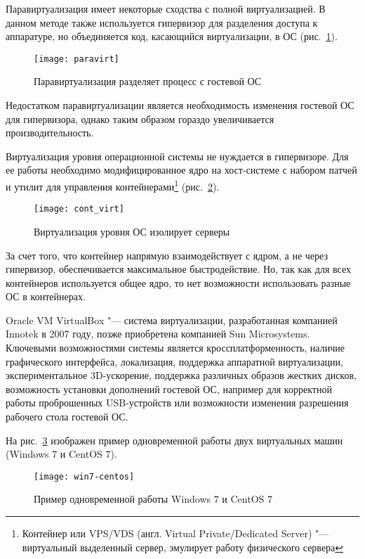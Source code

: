 Паравиртуализация имеет некоторые сходства с полной виртуализацией. 
В данном методе также используется гипервизор для разделения доступа к аппаратуре, но объединяется код, касающийся виртуализации, в ОС \cite{virtuallinux} (рис.~\ref{pic:paravirt}).
\begin{figure}[ht]
    \centering
	\texttt{[image: paravirt]}
	\caption{Паравиртуализация разделяет процесс с гостевой ОС}\label{pic:paravirt}
\end{figure}

Недостатком паравиртуализации является необходимость изменения гостевой ОС для гипервизора, однако таким образом гораздо увеличивается производительность.
 
Виртуализация уровня операционной системы не нуждается в гипервизоре. 
Для ее работы необходимо модифицированное ядро на хост-системе с набором патчей и утилит для управления контейнерами\footnote{Контейнер или VPS/VDS (англ. Virtual Private/Dedicated Server) "--- виртуальный выделенный сервер, эмулирует работу физического сервера} (рис.~\ref{pic:cont_virt}).
\begin{figure}[ht]
    \centering
	\texttt{[image: cont\_virt]}
	\caption{Виртуализация уровня ОС изолирует серверы}\label{pic:cont_virt}
\end{figure}

За счет того, что контейнер напрямую взаимодействует с ядром, а не через гипервизор, обеспечивается максимальное быстродействие. Но, так как для всех контейнеров используется общее ядро, то нет возможности использовать разные ОС в контейнерах.

Oracle VM VirtualBox "--- система виртуализации, разработанная компанией Innotek в 2007 году, позже приобретена компанией Sun Microsystems.
Ключевыми возможностями системы является кроссплатформенность, наличие графического интерфейса, локализация, поддержка аппаратной виртуализации, экспериментальное 3D-ускорение, поддержка различных образов жестких дисков, возможность установки дополнений гостевой ОС, например для корректной работы проброшенных USB-устройств или возможности изменения разрешения рабочего стола гостевой ОС.

На рис.~\ref{pic:win7-centos} изображен пример одновременной работы двух виртуальных машин (Windows 7 и CentOS 7).
\begin{figure}[ht]
    \centering
	\texttt{[image: win7-centos]}
	\caption{Пример одновременной работы Windows 7 и CentOS 7}\label{pic:win7-centos}
\end{figure}

